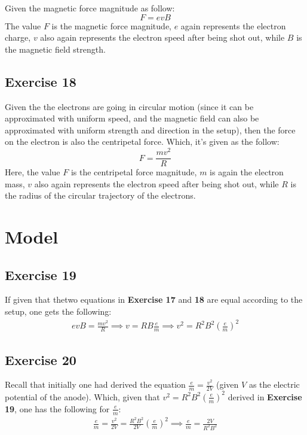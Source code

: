 \documentclass{article}
\begin{document}
Given the magnetic force magnitude as follow:
\begin{equation}
    F = evB
\end{equation}
The value $F$ is the magnetic force magnitude, $e$ again represents the electron charge, $v$ also again represents the electron speed after being shot out, while $B$ is the magnetic field strength.

\hfil

\subsection{Exercise 18}

Given the the electrons are going in circular motion (since it can be approximated with uniform speed, and the magnetic field can also be approximated with uniform strength and direction in the setup), then the force on the electron is also the centripetal force. Which, it's given as the follow:
\begin{equation}
    F = \frac{mv^2}{R}
\end{equation}
Here, the value $F$ is the centripetal force magnitude, $m$ is again the electron mass, $v$ also again represents the electron speed after being shot out, while $R$ is the radius of the circular trajectory of the electrons.

\newpage

\section{Model}

\subsection{Exercise 19}

If given that thetwo equations in \textbf{Exercise 17} and \textbf{18} are equal according to the setup, one gets the following:
\begin{align}
    evB = \frac{mv^2}{R}\implies v = RB \frac{e}{m}\implies v^2 = R^2B^2 \left(\frac{e}{m}\right)^2
\end{align}

\hfil

\subsection{Exercise 20}

Recall that initially one had derived the equation $\frac{e}{m} = \frac{v^2}{2V}$ (given $V$ as the electric potential of the anode). Which, given that $v^2 = R^2B^2\left(\frac{e}{m}\right)^2$ derived in \textbf{Exercise 19}, one has the following for $\frac{e}{m}$:
\begin{align}
    \frac{e}{m} = \frac{v^2}{2V} = \frac{R^2B^2}{2V}\left(\frac{e}{m}\right)^2 \implies \frac{e}{m} = \frac{2V}{R^2B^2}
\end{align}
\end{document}
